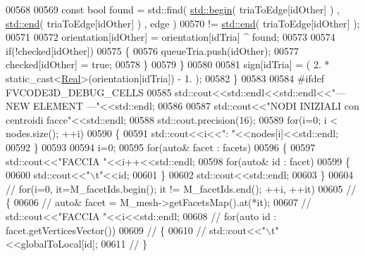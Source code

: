 \begin{DoxyCode}
00568 
00569                 \textcolor{keyword}{const} \textcolor{keywordtype}{bool} found = std::find( \hyperlink{namespacestd_acec9a198880c12f51f02be95a298a48b}{std::begin}( triaToEdge[idOther] ) , 
      \hyperlink{namespacestd_aeb4b319cf9afda99ba1f47d32df15bc9}{std::end}( triaToEdge[idOther] ) , edge )
00570                                    != \hyperlink{namespacestd_aeb4b319cf9afda99ba1f47d32df15bc9}{std::end}( triaToEdge[idOther] );
00571 
00572                 orientation[idOther] = orientation[idTria] ^ found;
00573 
00574                 \textcolor{keywordflow}{if}(!checked[idOther])
00575                 \{
00576                     queueTria.push(idOther);
00577                     checked[idOther] = \textcolor{keyword}{true};
00578                 \}
00579             \}
00580 
00581             sign[idTria] = ( 2. * \textcolor{keyword}{static\_cast<}\hyperlink{namespaceFVCode3D_a40c1f5588a248569d80aa5f867080e83}{Real}\textcolor{keyword}{>}(orientation[idTria]) - 1. );
00582         \}
00583 
00584 \textcolor{preprocessor}{#ifdef FVCODE3D\_DEBUG\_CELLS}
00585         std::cout<<std::endl<<std::endl<<\textcolor{stringliteral}{"--- NEW ELEMENT ---"}<<std::endl;
00586 
00587         std::cout<<\textcolor{stringliteral}{"NODI INIZIALI con centroidi facce"}<<std::endl;
00588         std::cout.precision(16);
00589         \textcolor{keywordflow}{for}(i=0; i < nodes.size(); ++i)
00590         \{
00591             std::cout<<i<<\textcolor{stringliteral}{": "}<<nodes[i]<<std::endl;
00592         \}
00593 
00594         i=0;
00595         \textcolor{keywordflow}{for}(\textcolor{keyword}{auto}& facet : facets)
00596         \{
00597             std::cout<<\textcolor{stringliteral}{"FACCIA "}<<i++<<std::endl;
00598             \textcolor{keywordflow}{for}(\textcolor{keyword}{auto}& \textcolor{keywordtype}{id} : facet)
00599             \{
00600                 std::cout<<\textcolor{stringliteral}{"\(\backslash\)t"}<<id;
00601             \}
00602             std::cout<<std::endl;
00603         \}
00604 \textcolor{comment}{//        for(i=0, it=M\_facetIds.begin(); it != M\_facetIds.end(); ++i, ++it)}
00605 \textcolor{comment}{//        \{}
00606 \textcolor{comment}{//            auto& facet = M\_mesh->getFacetsMap().at(*it);}
00607 \textcolor{comment}{//            std::cout<<"FACCIA "<<i<<std::endl;}
00608 \textcolor{comment}{//            for(auto id : facet.getVerticesVector())}
00609 \textcolor{comment}{//            \{}
00610 \textcolor{comment}{//                std::cout<<"\(\backslash\)t"<<globalToLocal[id];}
00611 \textcolor{comment}{//            \}}

\end{DoxyCode}
